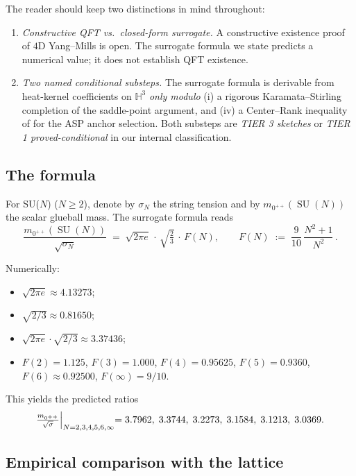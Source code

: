\documentclass[11pt,a4paper,reqno]{amsart}
\theoremstyle{definition}
\DeclareMathOperator{\SU}{SU}
\newcommand{\HH}{\mathbb{H}}
\begin{document}
The reader should keep two distinctions in mind throughout:

\begin{enumerate}[label=(\Roman*),leftmargin=2em]
   \item \emph{Constructive QFT vs.\ closed-form surrogate.} A constructive
         existence proof of $4$D Yang--Mills is open. The surrogate formula
         we state predicts a numerical value; it does not establish QFT
         existence.
   \item \emph{Two named conditional substeps.} The surrogate formula is
         derivable from heat-kernel coefficients on $\HH^3$ \emph{only modulo}
         (i) a rigorous Karamata--Stirling completion of the saddle-point
         argument, and (iv) a Center--Rank inequality of \cite{Remondiere2026CenterRank} for the ASP anchor selection. Both substeps are \emph{TIER
         3 sketches} or \emph{TIER 1 proved-conditional} in our internal
         classification.
\end{enumerate}

\subsection{The formula}\label{ss:formula}

For SU($N$) ($N\ge 2$), denote by $\sigma_N$ the string tension and by
$m_{0^{++}}(\SU(N))$ the scalar glueball mass. The surrogate formula reads
\begin{equation}\label{eq:surrogate}
   \frac{m_{0^{++}}(\SU(N))}{\sqrt{\sigma_N}}
   \;=\; \sqrt{2\pi e}\,\cdot\,\sqrt{\tfrac{2}{3}}\,\cdot\,F(N),
   \qquad F(N) \;:=\; \frac{9}{10}\,\frac{N^2+1}{N^2}\,.
\end{equation}

Numerically:
\begin{itemize}
  \item $\sqrt{2\pi e}\approx 4.13273$;
  \item $\sqrt{2/3}\approx 0.81650$;
  \item $\sqrt{2\pi e}\cdot\sqrt{2/3}\approx 3.37436$;
  \item $F(2)=1.125$, $F(3)=1.000$, $F(4)=0.95625$, $F(5)=0.9360$, $F(6)\approx 0.92500$, $F(\infty)=9/10$.
\end{itemize}
This yields the predicted ratios
\[
   \tfrac{m_{0^{++}}}{\sqrt{\sigma}}\Bigl|_{N=2,3,4,5,6,\infty} = 3.7962,\;3.3744,\;3.2273,\;3.1584,\;3.1213,\;3.0369.
\]

\subsection{Empirical comparison with the lattice}\label{ss:empiric}
\end{document}
